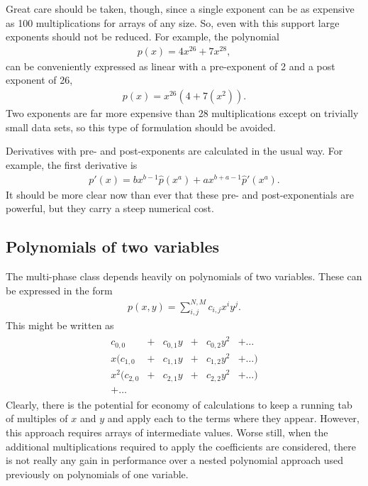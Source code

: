 \documentclass[letterpaper,11pt]{article}
\begin{document}
Great care should be taken, though, since a single exponent can be as expensive as 100 multiplications for arrays of any size.  So, even with this support large exponents should not be reduced.  For example, the polynomial
\begin{align}
p(x) = 4x^{26} + 7x^{28},
\end{align}
can be conveniently expressed as linear with a pre-exponent of 2 and a post exponent of 26,
\begin{align}
p(x) = x^{26} \left( 4 + 7(x^2) \right).
\end{align}
Two exponents are far more expensive than 28 multiplications except on trivially small data sets, so this type of formulation should be avoided.

Derivatives with pre- and post-exponents are calculated in the usual way.  For example, the first derivative is
\begin{align}
p'(x) = bx^{b-1} \hat{p}(x^a) + a x^{b+a-1} \hat{p}'(x^a).
\end{align}
It should be more clear now than ever that these pre- and post-exponentials are powerful, but they carry a steep numerical cost.

\subsection{Polynomials of two variables}

The multi-phase class depends heavily on polynomials of two variables.  These can be expressed in the form
\begin{align}
p(x,y) = \sum_{i,j}^{N,M} c_{i,j} x^i y^j.
\end{align}
This might be written as
\begin{align}
\begin{array}{rccccl}
c_{0,0} & + & c_{0,1} y & + & c_{0,2} y^2 & +\ldots\\
x\big(c_{1,0} & + & c_{1,1} y & + & c_{1,2} y^2 & +\ldots \big)\\
x^2\big(c_{2,0} & + & c_{2,1} y & + & c_{2,2} y^2 & +\ldots \big)\\
+\ldots & & & & &
\end{array}
\end{align}
Clearly, there is the potential for economy of calculations to keep a running tab of multiples of $x$ and $y$ and apply each to the terms where they appear.  However, this approach requires arrays of intermediate values.  Worse still, when the additional multiplications required to apply the coefficients are considered, there is not really any gain in performance over a nested polynomial approach used previously on polynomials of one variable.
\end{document}
